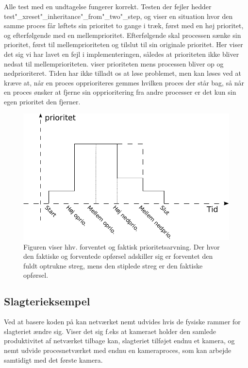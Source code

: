 Alle test med en undtagelse fungerer korrekt. Testen der fejler hedder test"_xreset"_inheritance"_from"_two"_step, og viser en situation hvor den samme proces får løftets sin prioritet to gange i træk, først med en høj prioritet, og efterfølgende med en mellemprioritet. Efterfølgende skal processen sænke sin prioritet, først til  mellemprioriteten og tilslut til sin originale prioritet. Her viser det sig vi har lavet en fejl i implementeringen, således at prioriteten ikke bliver nedsat til mellemprioriteten.  viser prioriteten mens processen bliver op og nedprioriteret. Tiden har ikke tilladt os at løse problemet, men  kan løses ved at kræve at, når en proces opprioriteres gemmes hvilken proces der står bag, så når en proces ønsker at fjerne sin opprioritering fra andre processer er det kun sin egen  prioritet den fjerner.  
 
  
\begin{figure}
 \begin{center}
  \includegraphics[scale=1]{images/priority-inheritance}
	\caption{Figuren viser hhv. forventet og faktisk prioritetsarvning. Der hvor den faktiske og forventede opførsel adskiller sig er forventet den fuldt optrukne streg, mens den stiplede streg er den faktiske opførsel.}
	\label{fig:priority-inheritance}
\end{center}
\end{figure}
  

\subsection{Slagterieksempel}

Ved at basere koden på \pycsp kan netværket nemt udvides hvis de fysiske rammer for slagteriet ændre sig. Viser det sig f.eks at kameraet holder den samlede produktivitet af netværket tilbage kan, slagteriet tilføjet endnu et kamera, og nemt udvide procesnetværket med endnu en kameraproces, som kan arbejde samtidigt med det første kamera. 


